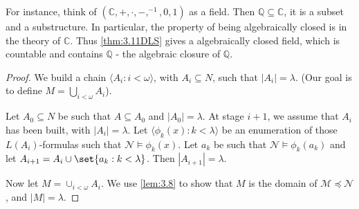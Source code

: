 \documentclass{article}
\let\models\vDash
\begin{document}
For instance, think of $(\mathbb{C}, + , \cdot, -, ^{-1}, 0,1)$ as a field. Then $\mathbb{Q} \subseteq \mathbb{C}$, it is a subset and a substructure.
In particular, the property of being algebraically closed is in the theory of $\mathbb{C}$.
Thus \cref{thm:3.11DLS} gives a algebraically closed field, which is countable and contains $\mathbb{Q}$ - the algebraic closure of $\mathbb{Q}$.

\begin{proof}
  We build a chain $\langle A_i  : i < \omega \rangle$, with $A_i \subseteq N$, such that $|A_i| = \lambda$.
  (Our goal is to define $M = \bigcup_{i < \omega} A_i$).

  Let $A_0 \subseteq N$ be such that $A \subseteq A_0$ and $|A_0| = \lambda$.
  At stage $i+1$, we assume that $A_i$ has been built, with $|A_i| = \lambda$.
  Let $\langle \phi_k(x) : k < \lambda  \rangle$ be an enumeration of those $L(A_i)$-formulas such that $\mathcal{N} \models \phi_k(x)$.
  Let $a_k$ be such that $\mathcal{N} \models \phi_k(a_k)$ and let $A_{i+1} = A_i \cup \set{a_k : k < \lambda}$.
  Then $|A_{i+1}| = \lambda$.

  Now let $M = \cup_{i < \omega} A_i$.
  We use \cref{lem:3.8} to show that $M$ is the domain of $\mathcal{M} \preccurlyeq \mathcal{N}$, and $|M| = \lambda$.
\end{proof}

\printindex
\end{document}
